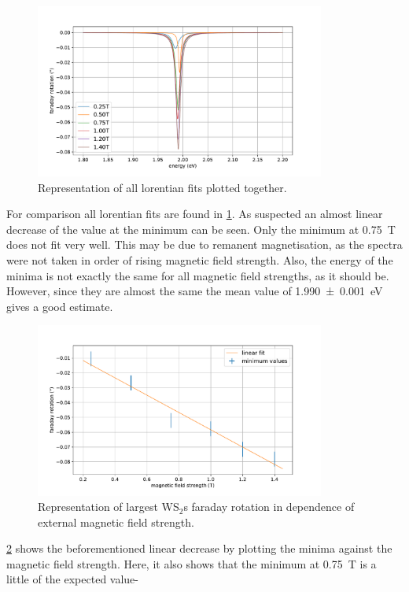 \begin{figure}[!ht]
    \centering
    \includegraphics[width=0.85\textwidth]{plots/WS2_lorentians.pdf}
    \caption{Representation of all lorentian fits plotted together.}
    \label{fig_WS2_lorentians}
\end{figure}
For comparison all lorentian fits are found in \cref{fig_WS2_lorentians}.
As suspected an almost linear decrease of the value at the minimum can be seen.
Only the minimum at \SI{0.75}{\tesla} does not fit very well.
This may be due to remanent magnetisation, as the spectra were not taken in order of rising magnetic field strength.
Also, the energy of the minima is not exactly the same for all magnetic field strengths, as it should be.
However, since they are almost the same the mean value of \SI{1.990+-0.001}{\electronvolt} gives a good estimate.

\begin{figure}[!ht]
    \centering
    \includegraphics[width=0.85\textwidth]{plots/WS2_mins.pdf}
    \caption{Representation of largest WS$_2$s faraday rotation in dependence of external magnetic field strength.}
    \label{fig_WS2_minima}
\end{figure}
\cref{fig_WS2_minima} shows the beforementioned linear decrease by plotting the minima against the magnetic field strength.
Here, it also shows that the minimum at \SI{0.75}{\tesla} is a little of the expected value-

